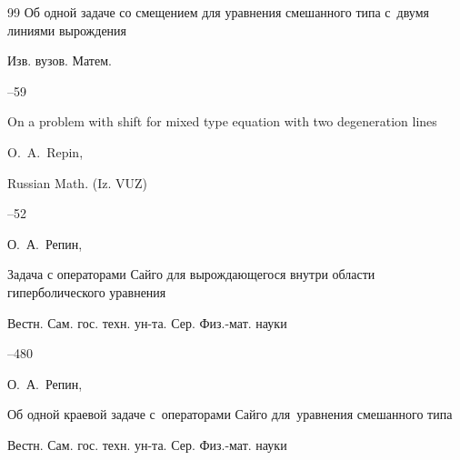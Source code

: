 \begin{thebibliography}{99}
\paper Об одной задаче со смещением для уравнения смешанного типа с~двумя линиями вырождения

\jour Изв. вузов. Матем.



--59


\transl

\paper On a problem with shift for mixed type equation with two degeneration lines

\by O.~A.~Repin,

\jour Russian Math. (Iz. VUZ)




--52







\by О.~А.~Репин,

\paper Задача с операторами Сайго для вырождающегося внутри области гиперболического уравнения

\jour Вестн. Сам. гос. техн. ун-та. Сер. Физ.-мат. науки




--480








\by О.~А.~Репин,

\paper Об одной краевой задаче с~операторами Сайго для~уравнения смешанного типа

\jour Вестн. Сам. гос. техн. ун-та. Сер. Физ.-мат. науки


\end{thebibliography}
